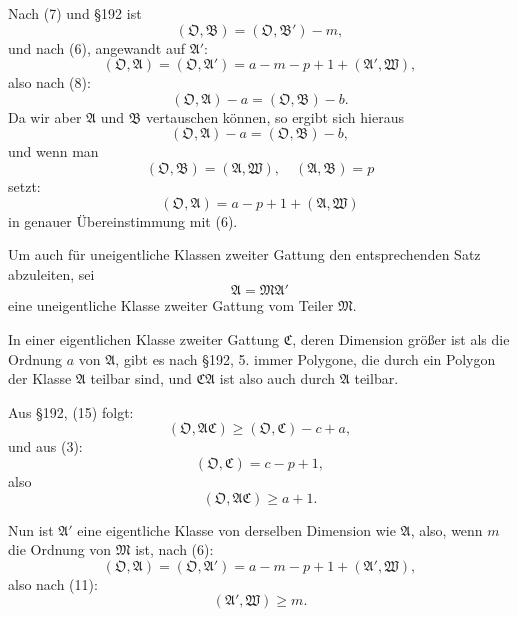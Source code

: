 \documentclass[12pt,a4paper]{article}
\begin{document}
Nach (7) und \S 192 ist
\begin{equation}\label{eq:199-9}
(\mathfrak{O}, \mathfrak{B}) = (\mathfrak{O}, \mathfrak{B}') - m,
\end{equation}
und nach (6), angewandt auf $\mathfrak{A}'$:
\[
(\mathfrak{O}, \mathfrak{A}) = (\mathfrak{O}, \mathfrak{A}') = a - m - p + 1 + (\mathfrak{A}', \mathfrak{W}),
\]
also nach (8):
\[
(\mathfrak{O}, \mathfrak{A}) - a = (\mathfrak{O}, \mathfrak{B}) - b.
\]
Da wir aber $\mathfrak{A}$ und $\mathfrak{B}$ vertauschen können, so ergibt sich hieraus
\[
(\mathfrak{O}, \mathfrak{A}) - a = (\mathfrak{O}, \mathfrak{B}) - b,
\]
und wenn man
\[
(\mathfrak{O}, \mathfrak{B}) = (\mathfrak{A}, \mathfrak{W}), \quad (\mathfrak{A}, \mathfrak{B}) = p
\]
setzt:
\[
(\mathfrak{O}, \mathfrak{A}) = a - p + 1 + (\mathfrak{A}, \mathfrak{W})
\]
in genauer Übereinstimmung mit (6).

Um auch für uneigentliche Klassen zweiter Gattung den entsprechenden Satz abzuleiten, sei
\begin{equation}\label{eq:199-10}
\mathfrak{A} = \mathfrak{M}\mathfrak{A}'
\end{equation}
eine uneigentliche Klasse zweiter Gattung vom Teiler $\mathfrak{M}$.

In einer eigentlichen Klasse zweiter Gattung $\mathfrak{C}$, deren Dimension größer ist als die Ordnung $a$ von $\mathfrak{A}$, gibt es nach \S 192, 5. immer Polygone, die durch ein Polygon der Klasse $\mathfrak{A}$ teilbar sind, und $\mathfrak{C}\mathfrak{A}$ ist also auch durch $\mathfrak{A}$ teilbar.

Aus \S 192, (15) folgt:
\[
(\mathfrak{O}, \mathfrak{A}\mathfrak{C}) \geq (\mathfrak{O}, \mathfrak{C}) - c + a,
\]
und aus (3):
\[
(\mathfrak{O}, \mathfrak{C}) = c - p + 1,
\]
also
\begin{equation}\label{eq:199-11}
(\mathfrak{O}, \mathfrak{A}\mathfrak{C}) \geq a + 1.
\end{equation}

Nun ist $\mathfrak{A}'$ eine eigentliche Klasse von derselben Dimension wie $\mathfrak{A}$, also, wenn $m$ die Ordnung von $\mathfrak{M}$ ist, nach (6):
\begin{equation}\label{eq:199-12}
(\mathfrak{O}, \mathfrak{A}) = (\mathfrak{O}, \mathfrak{A}') = a - m - p + 1 + (\mathfrak{A}', \mathfrak{W}),
\end{equation}
also nach (11):
\begin{equation}\label{eq:199-13}
(\mathfrak{A}', \mathfrak{W}) \geq m.
\end{equation}
\end{document}
